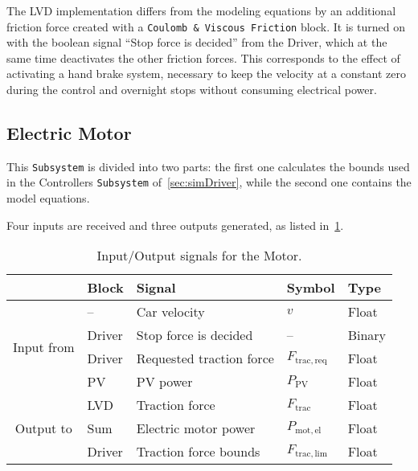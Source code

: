 The LVD implementation differs from the modeling equations by an additional friction force created with a \texttt{Coulomb \& Viscous Friction} block. It is turned on with the boolean signal \enquote{Stop force is decided} from the Driver, which at the same time deactivates the other friction forces. This corresponds to the effect of activating a hand brake system, necessary to keep the velocity at a constant zero during the control and overnight stops without consuming electrical power.


\subsection{Electric Motor}
\label{sec:simMotor}
This \texttt{Subsystem} is divided into two parts: the first one calculates the bounds used in the Controllers \texttt{Subsystem} of~\cref{sec:simDriver}, while the second one contains the model equations.

Four inputs are received and three outputs generated, as listed in~\cref{tab:simInOutMotor}.
\begin{table}[htbp]
	\centering
	\caption{Input/Output signals for the Motor.}
	\label{tab:simInOutMotor}
	
	\begin{tabular}{c l l l l}
		\toprule
		& Block & Signal & Symbol & Type \\ 
		\midrule
		\multirow{4}{*}{Input from}
		& -- & Car velocity & $v$ & Float \\
		& Driver & Stop force is decided & -- & Binary \\
		& Driver & Requested traction force & $F_\mathrm{trac,req}$ & Float \\
		& PV & PV power & $P_\mathrm{PV}$ & Float \\
		\midrule
		\multirow{3}{*}{Output to}
		& LVD & Traction force & $F_\mathrm{trac}$ & Float \\
		& Sum & Electric motor power & $P_\mathrm{mot,el}$ & Float \\
		& Driver & Traction force bounds & $F_\mathrm{trac,lim}$ & Float \\
		\bottomrule
	\end{tabular}
\end{table}


